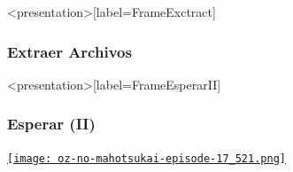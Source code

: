 \begin{frame}<presentation>[label=FrameExctract]
  \frametitle{Extraer Archivos}
 


\end{frame}

\begin{frame}<presentation>[label=FrameEsperarII]
  \frametitle{Esperar (II)}
\center
  \href{https://www.youtube.com/playlist?list=PLQkH8HQf-uqoNlgHH9g0eBzeIQbvKiilH}{
    \texttt{[image: oz-no-mahotsukai-episode-17\_521.png]}
  }
\end{frame}


